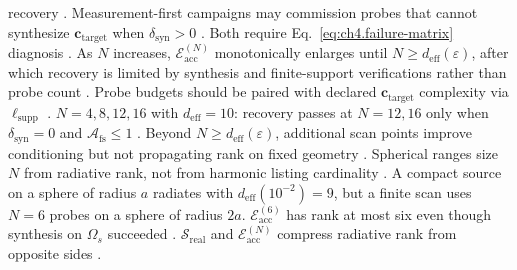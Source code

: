 recovery \cite{stratton1941}. Measurement-first campaigns may commission probes that cannot synthesize
\(\mathbf{c}_{\mathrm{target}}\) when \(\delta_{\mathrm{syn}}>0\) \cite{stratton1941}. Both require Eq.~\eqref{eq:ch4.failure-matrix} diagnosis
\cite{devaney2004}.
As \(N\) increases, \(\mathcal{E}_{\mathrm{acc}}^{(N)}\) monotonically enlarges until \(N\ge d_{\mathrm{eff}}(\varepsilon)\), after which recovery is
limited by synthesis and finite-support verifications rather than probe count \cite{stratton1941}.
Probe budgets should be paired with declared \(\mathbf{c}_{\mathrm{target}}\) complexity via \(\ell_{\mathrm{supp}}\) \cite{harrington2001}.
\(N=4,8,12,16\) with \(d_{\mathrm{eff}}=10\): recovery passes at \(N=12,16\) only when \(\delta_{\mathrm{syn}}=0\) and \(\mathcal{A}_{\mathrm{fs}}\le1\)
\cite{stratton1941}.
Beyond $N\ge d_{\mathrm{eff}}(\varepsilon)$, additional scan points improve conditioning but not propagating rank on fixed geometry \cite{stratton1941}. Spherical ranges size $N$ from radiative rank, not from harmonic listing cardinality \cite{hansen1988}.
A compact source on a sphere of radius $a$ radiates with $d_{\mathrm{eff}}(10^{-2})=9$, but a finite scan uses $N=6$ probes on a sphere of radius $2a$. $\mathcal{E}_{\mathrm{acc}}^{(6)}$ has rank at most six even though synthesis on $\Omega_{s}$ succeeded \cite{devaney2004}. $\mathcal{S}_{\mathrm{real}}$ and $\mathcal{E}_{\mathrm{acc}}^{(N)}$ compress radiative rank from opposite sides \cite{stratton1941}.

